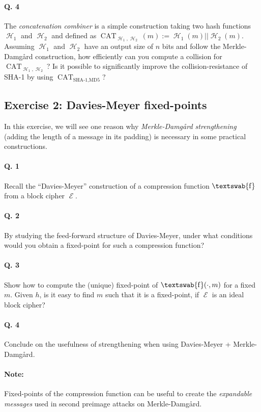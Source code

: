 \documentclass[11pt,a4paper]{article}
\DeclareMathOperator\hash{\mathcal{H}}
\DeclareMathOperator\E{\mathcal{E}}
\DeclareMathOperator\comp{\textswab{f}}
\DeclareMathOperator\cat{\mathrm{CAT}}
\begin{document}
\paragraph{Q. 4} The \emph{concatenation combiner} is a simple construction taking two hash functions $\hash_1$ and $\hash_2$ and defined as
$\cat_{\hash_1,\hash_2}(m) := \hash_1(m)||\hash_2(m)$. Assuming $\hash_1$ and $\hash_2$ have an output size of $n$ bits and follow the Merkle-Damg\aa rd construction,
how efficiently can you compute a collision for $\cat_{\hash_1, \hash_2}$? Is it possible to significantly improve the collision-resistance of SHA-1 by using
$\cat_{\text{SHA-1}, \text{MD5}}$?


\subsection*{Exercise 2: Davies-Meyer fixed-points}
In this exercise, we will see one reason why \emph{Merkle-Damg\aa rd strengthening} (adding the length of a message in its padding) is necessary
in some practical constructions.

\paragraph{Q. 1} Recall the ``Davies-Meyer'' construction of a compression function $\comp$ from a block cipher $\E$.

\paragraph{Q. 2} By studying the feed-forward structure of Davies-Meyer, under what conditions would you obtain a fixed-point for such a compression function?

\paragraph{Q. 3} Show how to compute the (unique) fixed-point of $\comp(\cdot,m)$ for a fixed $m$. Given $h$, is it easy to find $m$ such that it is a fixed-point,
if $\E$ is an ideal block cipher?

\paragraph{Q. 4} Conclude on the usefulness of strengthening when using Davies-Meyer + Merkle-Damg\aa rd.

\paragraph{Note:} Fixed-points of the compression function can be useful to create the \emph{expandable messages} used in second preimage attacks on Merkle-Damg\aa rd.
\end{document}
